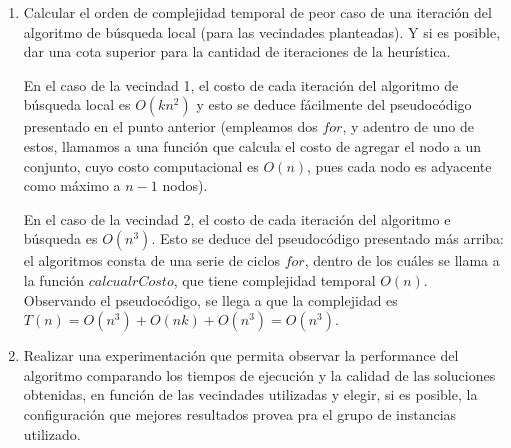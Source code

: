 \documentclass[11pt, a4paper, twoside]{article}
\begin{document}
\begin{enumerate}
\begin{enumerate}
		\item Calcular el orden de complejidad temporal de peor caso de una iteración del algoritmo de búsqueda local
			  (para las vecindades planteadas). Y si es posible, dar una cota superior para la cantidad de iteraciones
			  de la heurística. 
			  
			  En el caso de la vecindad 1, el costo de cada iteración del algoritmo de búsqueda local es $O(kn^2)$ y esto
			  se deduce fácilmente del pseudocódigo presentado en el punto anterior (empleamos dos $for$, y adentro de uno
			  de estos, llamamos a una función que calcula el costo de agregar el nodo a un conjunto, cuyo costo computacional
			  es $O(n)$, pues cada nodo es adyacente como máximo a $n-1$ nodos).
			  
			  En el caso de la vecindad 2, el costo de cada iteración del algoritmo e búsqueda es $ O(n^3) $. Esto se deduce
			  del pseudocódigo presentado más arriba: el algoritmos consta de una serie de ciclos $for$, dentro de los
			  cuáles se llama a la función $calcualrCosto$, que tiene complejidad temporal $O(n)$. Observando el pseudocódigo,
			  se llega a que la complejidad es $T(n) = O(n^3) + O(nk) + O(n^3) = O(n^3) $.
			  
	    \item Realizar una experimentación que permita observar la performance del algoritmo comparando los tiempos
			  de ejecución y la calidad de las soluciones obtenidas, en función de las vecindades utilizadas y elegir,
			  si es posible, la configuración que mejores resultados provea pra el grupo de instancias utilizado.
    \end{enumerate}
\end{enumerate}





\end{document}
